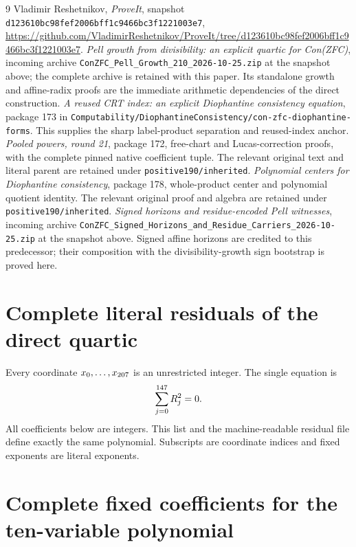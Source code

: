 \documentclass[11pt,letterpaper]{article}
\theoremstyle{remark}\newtheorem{remark}[theorem]{Remark}
\newcommand{\code}[1]{\nolinkurl{#1}}
\begin{document}
\begin{thebibliography}{9}
 Vladimir Reshetnikov, \emph{ProveIt}, snapshot
\code{d123610bc98fef2006bff1c9466bc3f1221003e7},
\url{https://github.com/VladimirReshetnikov/ProveIt/tree/d123610bc98fef2006bff1c9466bc3f1221003e7}.
 \emph{Pell growth from divisibility: an explicit quartic
for Con(ZFC)}, incoming archive \code{ConZFC_Pell_Growth_210_2026-10-25.zip}
at the snapshot above; the complete archive is retained with this paper.
Its standalone growth and affine-radix proofs are the immediate arithmetic
dependencies of the direct construction.
 \emph{A reused CRT index: an explicit Diophantine
consistency equation}, package 173 in
\code{Computability/DiophantineConsistency/con-zfc-diophantine-forms}.
This supplies the sharp label-product separation and reused-index anchor.
 \emph{Pooled powers, round 21}, package 172, free-chart
and Lucas-correction proofs, with the complete pinned native coefficient
tuple. The relevant original text and literal parent are retained under
\code{positive190/inherited}.
 \emph{Polynomial centers for Diophantine consistency},
package 178, whole-product center and polynomial quotient identity.
The relevant original proof and algebra are retained under
\code{positive190/inherited}.
 \emph{Signed horizons and residue-encoded Pell witnesses},
incoming archive \code{ConZFC_Signed_Horizons_and_Residue_Carriers_2026-10-25.zip}
at the snapshot above. Signed affine horizons are credited to this
predecessor; their composition with the divisibility-growth sign bootstrap
is proved here.
\end{thebibliography}

\appendix
\section{Complete literal residuals of the direct quartic}
\label{app:residuals}

Every coordinate $x_0,\ldots,x_{207}$ is an unrestricted
integer. The single equation is
\[
 \sum_{j=0}^{147}R_j^2=0.
\]
All coefficients below are integers. This list and the machine-readable
residual file define exactly the same polynomial. Subscripts are coordinate
indices and fixed exponents are literal exponents.


\section{Complete fixed coefficients for the ten-variable polynomial}
\label{app:coefficients}

\end{document}
